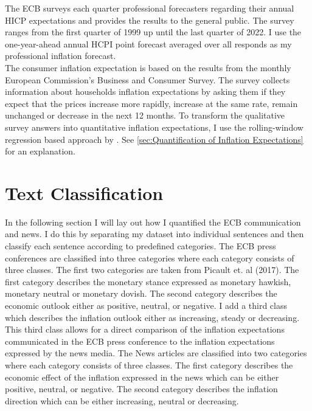 \documentclass[review]{elsarticle}
\begin{document}
The ECB surveys each quarter professional forecasters regarding their annual HICP expectations and provides the results to the general public. The survey ranges from the first quarter of 1999 up until the last quarter of 2022. I use the one-year-ahead annual HCPI point forecast averaged over all responds as my professional inflation forecast. 
\\
The consumer inflation expectation is based on the results from the monthly European Commission's Business and Consumer Survey. The survey collects information about households inflation expectations by asking them if they expect that the prices increase more rapidly, increase at the same rate, remain unchanged or decrease in the next 12 months. To transform the qualitative survey answers into quantitative inflation expectations, I use the rolling-window regression based approach by \cite{Lahiri2015}. See \ref{sec:Quantification of Inflation Expectations} for an explanation.

\section{Text Classification} \label{sec:Text Classification}

In the following section I will lay out how I quantified the ECB communication and news. I do this by separating my dataset into individual sentences and then classify each sentence according to predefined categories. The ECB press conferences are classified into three categories where each category consists of three classes. The first two categories are taken from Picault et. al (2017). The first category describes the monetary stance expressed as monetary hawkish, monetary neutral or monetary dovish. The second category describes the economic outlook either as positive, neutral, or negative. I add a third class which describes the inflation outlook either as increasing, steady or decreasing. This third class allows for a direct comparison of the inflation expectations communicated in the ECB press conference to the inflation expectations expressed by the news media.
The News articles are classified into two categories where each category consists of three classes. The first category describes the economic effect of the inflation expressed in the news which can be either positive, neutral, or negative. The second category describes the inflation direction which can be either increasing, neutral or decreasing.
\end{document}
